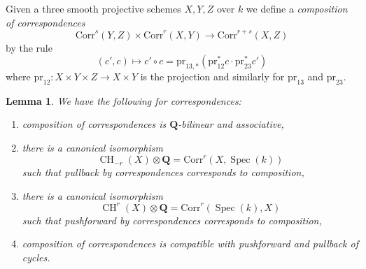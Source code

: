 \documentclass{stacks-project}
\theoremstyle{plain}
\newtheorem{lemma}[subsection]{Lemma}
\theoremstyle{definition}
\theoremstyle{remark}
\numberwithin{equation}{subsection}
\def\Spec{\mathop{\mathrm{Spec}}}
\def\CH{\mathop{\mathrm{CH}}\nolimits}
\begin{document}
\medskip\noindent
Given a three smooth projective schemes $X, Y, Z$ over $k$ we define a
{\it composition of correspondences}
$$
\text{Corr}^s(Y, Z)
\times
\text{Corr}^r(X, Y)
\longrightarrow
\text{Corr}^{r + s}(X, Z)
$$
by the rule
$$
(c', c)
\longmapsto
c' \circ c =
\text{pr}_{13, *}(\text{pr}_{12}^*c \cdot \text{pr}_{23}^*c')
$$
where $\text{pr}_{12} : X \times Y \times Z \to X \times Y$
is the projection and similarly for $\text{pr}_{13}$ and $\text{pr}_{23}$.

\begin{lemma}
\label{lemma-composition-correspondences}
We have the following for correspondences:
\begin{enumerate}
\item composition of correspondences is $\mathbf{Q}$-bilinear
and associative,
\item there is a canonical isomorphism
$$
\CH_{-r}(X) \otimes \mathbf{Q} = \text{Corr}^r(X, \Spec(k))
$$
such that pullback by correspondences corresponds to composition,
\item there is a canonical isomorphism
$$
\CH^r(X) \otimes \mathbf{Q} = \text{Corr}^r(\Spec(k), X)
$$
such that pushforward by correspondences corresponds to composition,
\item composition of correspondences is compatible with pushforward and
pullback of cycles.
\end{enumerate}
\end{lemma}
\end{document}
